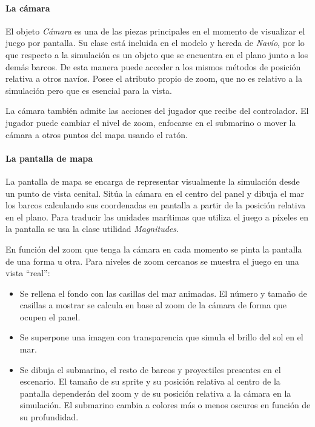 \documentclass[a4paper,
	11pt,
	parskip=full,
	bibliography=totoc,
	twoside
	]{scrartcl}
\begin{document}
		\paragraph{La cámara}
			El objeto \textit{Cámara} es una de las piezas principales en el momento de visualizar el juego por pantalla. Su clase está incluida en el modelo y hereda de \textit{Navío}, por lo que respecto a la simulación es un objeto que se encuentra en el plano junto a los demás barcos. De esta manera puede acceder a los mismos métodos de posición relativa a otros navíos. Posee el atributo propio de zoom, que no es relativo a la simulación pero que es esencial para la vista.
			
			La cámara también admite las acciones del jugador que recibe del controlador. El jugador puede cambiar el nivel de zoom, enfocarse en el submarino o mover la cámara a otros puntos del mapa usando el ratón.
			
		\paragraph{La pantalla de mapa}
			La pantalla de mapa se encarga de representar visualmente la simulación desde un punto de vista cenital. Sitúa la cámara en el centro del panel y dibuja el mar los barcos calculando sus coordenadas en pantalla a partir de la posición relativa en el plano. Para traducir las unidades marítimas que utiliza el juego a píxeles en la pantalla se usa la clase utilidad \textit{Magnitudes}.
			
			En función del zoom que tenga la cámara en cada momento se pinta la pantalla de una forma u otra. Para niveles de zoom cercanos se muestra el juego en una vista ``real'':
			
			\begin{itemize}[noitemsep]
				\item Se rellena el fondo con las casillas del mar animadas. El número y tamaño de casillas a mostrar se calcula en base al zoom de la cámara de forma que ocupen el panel.
				\item Se superpone una imagen con transparencia que simula el brillo del sol en el mar.
				\item Se dibuja el submarino, el resto de barcos y proyectiles presentes en el escenario. El tamaño de su sprite y su posición relativa al centro de la pantalla dependerán del zoom y de su posición relativa a la cámara en la simulación. El submarino cambia a colores más o menos oscuros en función de su profundidad.
			\end{itemize}
		
\end{document}
